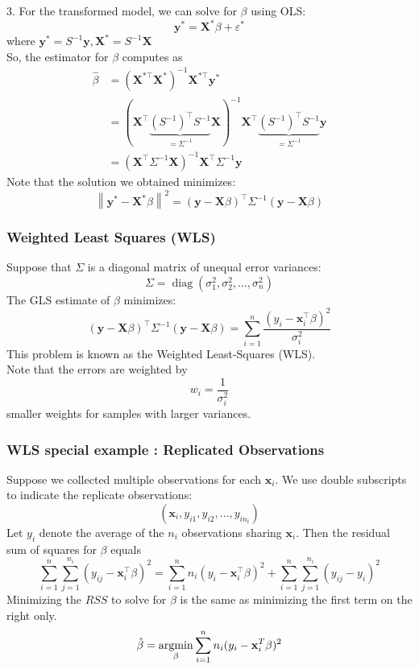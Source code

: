 \documentclass[11pt,a4paper]{article}
\newcommand{\argmin}{\operatornamewithlimits{argmin}}
\begin{document}
3. For the transformed model, we can solve for $\beta$ using OLS:
$$
\mathbf{y}^{*}=\mathbf{X}^{*} \beta+\varepsilon^{*}
$$
where $\mathbf{y}^{*}=S^{-1} \mathbf{y}, \mathbf{X}^{*}=S^{-1} \mathbf{X}$\\
So, the estimator for $\beta$ computes as
$$
\begin{aligned}
\hat{\beta} &=\left(\mathbf{X}^{* \top} \mathbf{X}^{*}\right)^{-1} \mathbf{X}^{* \top} \mathbf{y}^{*} \\
&=(\mathbf{X}^{\top} \underbrace{\left(S^{-1}\right)^{\top} S^{-1}}_{=\Sigma^{-1}} \mathbf{X})^{-1} \mathbf{X}^{\top} \underbrace{\left(S^{-1}\right)^{\top} S^{-1}}_{=\Sigma^{-1}} \mathbf{y} \\
&=\left(\mathbf{X}^{\top} \Sigma^{-1} \mathbf{X}\right)^{-1} \mathbf{X}^{\top} \Sigma^{-1} \mathbf{y}
\end{aligned}
$$
Note that the solution we obtained minimizes:
$$
\left\|\mathbf{y}^{*}-\mathbf{X}^{*} \beta\right\|^{2}=(\mathbf{y}-\mathbf{X} \beta)^{\top} \Sigma^{-1}(\mathbf{y}-\mathbf{X} \beta)
$$

\subsubsection{Weighted Least Squares (WLS)}
Suppose that $\Sigma$ is a diagonal matrix of unequal error variances:
$$
\Sigma=\operatorname{diag}\left(\sigma_{1}^{2}, \sigma_{2}^{2}, \ldots, \sigma_{n}^{2}\right)
$$
The GLS estimate of $\beta$ minimizes:
$$
(\mathbf{y}-\mathbf{X} \beta)^{\top} \Sigma^{-1}(\mathbf{y}-\mathbf{X} \beta)=\sum_{i=1}^{n} \frac{\left(y_{i}-\mathbf{x}_{i}^{\top} \beta\right)^{2}}{\sigma_{i}^{2}}
$$
This problem is known as the Weighted Least-Squares (WLS).\\
Note that the errors are weighted by
$$
w_{i}=\frac{1}{\sigma_{i}^{2}}
$$
smaller weights for samples with larger variances.

\subsubsection{WLS special example : Replicated Observations}
Suppose we collected multiple observations for each $\mathbf{x}_{i}$. We use double subscripts to indicate the replicate observations:
$$
\left(\mathbf{x}_{i}, y_{i 1}, y_{i 2}, \ldots, y_{i n_{i}}\right)
$$
Let $y_{i}$ denote the average of the $n_{i}$ observations sharing $\mathbf{x}_{i}$. Then the residual sum of squares for $\beta$ equals
$$
\sum_{i=1}^{n} \sum_{j=1}^{n_{i}}\left(y_{i j}-\mathbf{x}_{i}^{\top} \beta\right)^{2}=\sum_{i=1}^{n} n_{i}\left(y_{i}-\mathbf{x}_{i}^{\top} \beta\right)^{2}+\sum_{i=1}^{n} \sum_{j=1}^{n_{i}}\left(y_{i j}-y_{i}\right)^{2}
$$
Minimizing the $RSS$ to solve for $\beta$ is the same as minimizing the ﬁrst term on the right only.
$$\hat{\beta}=\argmin_\beta \sum_{i=1}^n n_i(y_i-\mathbf{x}_i^T\beta)^2$$
\end{document}
